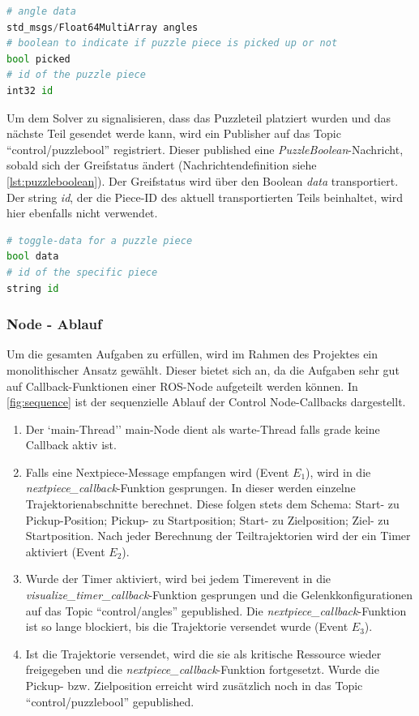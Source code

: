 \begin{lstlisting}[language=Python, caption={Nachrichten Definition für die Nachrit Angles},label=lst:Angles]
# angle data
std_msgs/Float64MultiArray angles
# boolean to indicate if puzzle piece is picked up or not
bool picked
# id of the puzzle piece
int32 id

\end{lstlisting}

Um dem Solver zu signalisieren, dass das Puzzleteil platziert wurden und das nächste Teil gesendet werde kann, wird ein Publisher auf das Topic ``control/puzzlebool'' registriert. Dieser published eine \textit{PuzzleBoolean}-Nachricht, sobald sich der Greifstatus ändert (Nachrichtendefinition siehe \autoref{lst:puzzleboolean}). Der Greifstatus wird über den Boolean \textit{data} transportiert. Der string \textit{id}, der die Piece-ID des aktuell transportierten Teils beinhaltet, wird hier ebenfalls nicht verwendet.
\begin{lstlisting}[language=Python, caption={Nachrichten Definition für die Nachricht PuzzleBoolean},label=lst:puzzleboolean]
# toggle-data for a puzzle piece
bool data
# id of the specific piece
string id
\end{lstlisting}

 
\subsubsection{Node - Ablauf}
Um die gesamten Aufgaben zu erfüllen, wird im Rahmen des Projektes ein monolithischer Ansatz gewählt. Dieser bietet sich an, da die Aufgaben sehr gut auf Callback-Funktionen einer ROS-Node aufgeteilt werden können. In \autoref{fig:sequence} ist der sequenzielle Ablauf der Control Node-Callbacks dargestellt. 
\begin{enumerate}
    \item Der `main-Thread'' main-Node dient als warte-Thread falls grade keine Callback aktiv ist.
    \item Falls eine Nextpiece-Message empfangen wird (Event $E_1$), wird in die \textit{nextpiece\_callback}-Funktion gesprungen. In dieser werden einzelne Trajektorienabschnitte berechnet. Diese folgen stets dem Schema: Start- zu Pickup-Position; Pickup- zu Startposition; Start- zu Zielposition; Ziel- zu Startposition. Nach jeder Berechnung der Teiltrajektorien wird der ein Timer aktiviert (Event $E_2$).
    \item Wurde der Timer aktiviert, wird bei jedem Timerevent in die \textit{visualize\_timer\_callback}-Funktion gesprungen und die Gelenkkonfigurationen 
    auf das Topic ``control/angles'' gepublished. Die \textit{nextpiece\_callback}-Funktion ist so lange blockiert, bis die Trajektorie versendet wurde (Event $E_3$).
    \item Ist die Trajektorie versendet, wird die sie als kritische Ressource wieder freigegeben und die \textit{nextpiece\_callback}-Funktion fortgesetzt. Wurde die Pickup- bzw. Zielposition erreicht wird zusätzlich noch in das Topic ``control/puzzlebool'' gepublished.
\end{enumerate}

